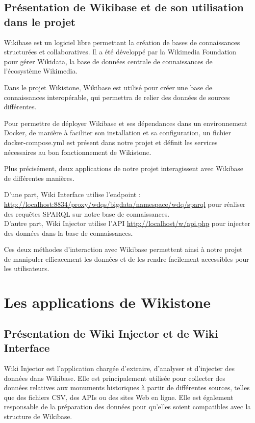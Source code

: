 \documentclass[a4paper, 12pt]{article}
\begin{document}
    \subsection{Présentation de Wikibase et de son utilisation dans le projet}

Wikibase est un logiciel libre permettant la création de bases de connaissances structurées et collaboratives. Il a été développé par la Wikimedia Foundation pour gérer Wikidata, la base de données centrale de connaissances de l'écosystème Wikimedia.

Dans le projet Wikistone, Wikibase est utilisé pour créer une base de connaissances interopérable, qui permettra de relier des données de sources différentes.

Pour permettre de déployer Wikibase et ses dépendances dans un environnement Docker, de manière à faciliter son installation et sa configuration, un fichier docker-compose.yml est présent dans notre projet et définit les services nécessaires au bon fonctionnement de Wikistone.


Plus précisément, deux applications de notre projet interagissent avec Wikibase de différentes manières. 

D'une part, Wiki Interface utilise l'endpoint : \\ \href{http://localhost:8834/proxy/wdqs/bigdata/namespace/wdq/sparql}{http://localhost:8834/proxy/wdqs/bigdata/namespace/wdq/sparql} pour réaliser des requêtes SPARQL sur notre base de connaissances. \\
D'autre part, Wiki Injector utilise l'API \href{http://localhost/w/api.php}{http://localhost/w/api.php} pour injecter des données dans la base de connaissances.

Ces deux méthodes d'interaction avec Wikibase permettent ainsi à notre projet de manipuler efficacement les données et de les rendre facilement accessibles pour les utilisateurs.
    
\section{Les applications de Wikistone}
    \subsection{Présentation de Wiki Injector et de Wiki Interface}


Wiki Injector est l'application chargée d'extraire, d'analyser et d'injecter des données dans Wikibase. Elle est principalement utilisée pour collecter des données relatives aux monuments historiques à partir de différentes sources, telles que des fichiers CSV, des APIs ou des sites Web en ligne. Elle est également responsable de la préparation des données pour qu'elles soient compatibles avec la structure de Wikibase.
\end{document}
